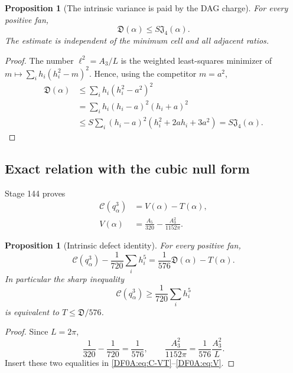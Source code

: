 \documentclass[11pt]{amsart}
\numberwithin{equation}{section}
\newtheorem{proposition}[theorem]{Proposition}
\theoremstyle{definition}
\theoremstyle{remark}
\newcommand{\Jfour}{\mathfrak J_4}
\newcommand{\Cnull}{\mathcal C}
\begin{document}
\begin{proposition}[The intrinsic variance is paid by the DAG charge]
\label{DF0A:prop:D-J}
For every positive fan,
\begin{equation}\label{DF0A:eq:D-J}
 \boxed{\mathfrak D(\alpha)\le S\Jfour(\alpha).}
\end{equation}
The estimate is independent of the minimum cell and all adjacent ratios.
\end{proposition}

\begin{proof}
The number $\ell^2=A_3/L$ is the weighted least-squares minimizer of
$m\mapsto\sum_i h_i(h_i^2-m)^2$.  Hence, using the competitor $m=a^2$,
\begin{align*}
 \mathfrak D(\alpha)
 &\le\sum_i h_i(h_i^2-a^2)^2\\
 &=\sum_i h_i(h_i-a)^2(h_i+a)^2\\
 &\le S\sum_i(h_i-a)^2(h_i^2+2ah_i+3a^2)
 =S\Jfour(\alpha).
\end{align*}
\end{proof}

\subsection{Exact relation with the cubic null form}

Stage 144 proves
\begin{align}
 \Cnull(q_\alpha^3)&=V(\alpha)-T(\alpha),\label{DF0A:eq:C-VT}\\
 V(\alpha)&=\frac{A_5}{320}-\frac{A_3^2}{1152\pi}.
 \label{DF0A:eq:V}
\end{align}

\begin{proposition}[Intrinsic defect identity]
\label{DF0A:prop:defect}
For every positive fan,
\begin{equation}\label{DF0A:eq:defect}
 \boxed{
 \Cnull(q_\alpha^3)-\frac1{720}\sum_i h_i^5
 =\frac1{576}\mathfrak D(\alpha)-T(\alpha).}
\end{equation}
In particular the sharp inequality
\begin{equation}\label{DF0A:eq:sharp-candidate}
 \Cnull(q_\alpha^3)\ge\frac1{720}\sum_i h_i^5
\end{equation}
is equivalent to $T\le\mathfrak D/576$.
\end{proposition}

\begin{proof}
Since $L=2\pi$,
\[
 \frac1{320}-\frac1{720}=\frac1{576},
 \qquad
 \frac{A_3^2}{1152\pi}=\frac1{576}\frac{A_3^2}{L}.
\]
Insert these two equalities in \eqref{DF0A:eq:C-VT}--\eqref{DF0A:eq:V}.
\end{proof}
\end{document}
